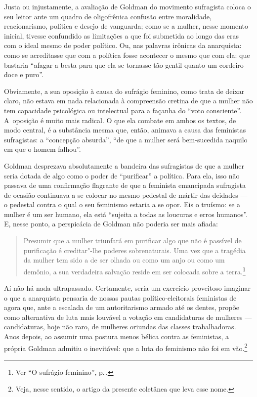 Justa ou injustamente, a avaliação de Goldman do movimento sufragista
coloca o seu leitor ante um quadro de oligofrênica confusão entre
moralidade, reacionarismo, política e desejo de vanguarda; como se a
mulher, nesse momento inicial, tivesse confundido as limitações a que
foi submetida ao longo das eras com o ideal mesmo de poder político. Ou,
nas palavras irônicas da anarquista: como se acreditasse que com a
política fosse acontecer o mesmo que com ela: que bastaria ``afagar a
besta para que ela se tornasse tão gentil quanto um cordeiro doce e
puro''.

Obviamente, a sua oposição à causa do sufrágio feminino, como
trata de deixar claro, não estava em nada relacionada à compreensão
cretina de que a mulher não tem capacidade psicológica ou intelectual
para a façanha do ``voto consciente''. A~oposição é muito mais
radical. O que ela combate em ambos os textos, de modo central, é a
substância mesma que, então, animava a causa das feministas sufragistas:
a ``concepção absurda'', ``de que a mulher será bem-sucedida naquilo em
que o homem falhou''.

Goldman desprezava absolutamente a
bandeira das sufragistas de que a mulher seria dotada de algo como o
poder de ``purificar'' a política. Para ela, isso não passava de
uma confirmação flagrante de que a feminista emancipada sufragista de
ocasião continuava a se colocar no mesmo pedestal de mártir das deidades
--- o pedestal contra o qual o seu feminismo estaria a se
opor. Eis o truísmo: se a mulher é um ser humano, ela está ``sujeita a
todas as loucuras e erros humanos''. E, nesse ponto, a perspicácia de
Goldman não poderia ser mais afiada:

\begin{quote}
Presumir que a mulher triunfará em
purificar algo que não é passível de purificação é creditar"-lhe poderes
sobrenaturais. Uma vez que a tragédia da mulher tem sido a de ser olhada
ou como um anjo ou como um demônio, a sua verdadeira salvação reside em ser
colocada sobre a terra.\footnote{Ver ``O sufrágio feminino'', p.\,\pageref{purificar}.}
\end{quote}

Aí não há nada ultrapassado. Certamente, seria um exercício proveitoso
imaginar o que a anarquista pensaria de nossas pautas
político-eleitorais feministas de agora que, ante a escalada de um
autoritarismo armado até os dentes, propõe como alternativa de luta mais
louvável a votação em candidaturas de mulheres --- candidaturas,
hoje não raro, de mulheres oriundas das classes trabalhadoras.
Anos depois, ao assumir uma postura menos bélica contra as feministas, a
própria Goldman admitiu o inevitável: que a luta do feminismo não foi em
vão.\footnote{Veja, nesse sentido, o artigo da presente coletânea que leva esse
nome.}

